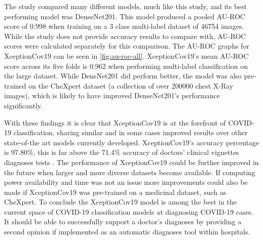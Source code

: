 The \cite{bressem2020comparing} study compared many different models, much like this study, and its best performing model was DenseNet201. This model produced a pooled AU-ROC score of 0.998 when training on a 3 class multi-label dataset of 46754 images. While the study does not provide accuracy results to compare with, AU-ROC scores were calculated separately for this comparison. The AU-ROC graphs for XceptionCov19 can be seen in \autoref{fig:au-roc-all}. XceptionCov19's mean AU-ROC score across its five folds is 0.962 when performing multi-label classification on the large dataset. While \cite{bressem2020comparing} DensNet201 did perform better, the model was also pre-trained on the CheXpert dataset (a collection of over 200000 chest X-Ray images), which is likely to have improved DenseNet201's performance significantly.

With these findings it is clear that XceptionCov19 is at the forefront of COVID-19 classification, sharing similar and in some cases improved results over other state-of-the art models currently developed. XceptionCov19's accuracy percentage is 97.80\%, this is far above the 71.4\% accuracy of doctors' clinical vignettes diagnoses tests \citep{richens2020improving}. The performance of XceptionCov19 could be further improved in the future when larger and more diverse datasets become available. If computing power availability and time was not an issue more improvements could also be made if XceptionCov19 was pre-trained on a medicinal dataset, such as CheXpert. To conclude the XceptionCov19 model is among the best in the current space of COVID-19 classification models at diagnosing COVID-19 cases. It should be able to successfully support a doctor's diagnoses by providing a second opinion if implemented as an automatic diagnoses tool within hospitals.